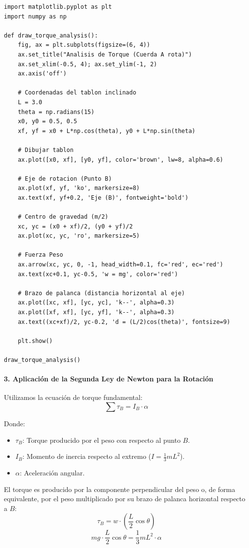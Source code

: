 \documentclass[12pt, a4paper]{article}
\begin{document}
\begin{lstlisting}
import matplotlib.pyplot as plt
import numpy as np

def draw_torque_analysis():
    fig, ax = plt.subplots(figsize=(6, 4))
    ax.set_title("Analisis de Torque (Cuerda A rota)")
    ax.set_xlim(-0.5, 4); ax.set_ylim(-1, 2)
    ax.axis('off')

    # Coordenadas del tablon inclinado
    L = 3.0
    theta = np.radians(15)
    x0, y0 = 0.5, 0.5
    xf, yf = x0 + L*np.cos(theta), y0 + L*np.sin(theta)
    
    # Dibujar tablon
    ax.plot([x0, xf], [y0, yf], color='brown', lw=8, alpha=0.6)
    
    # Eje de rotacion (Punto B)
    ax.plot(xf, yf, 'ko', markersize=8)
    ax.text(xf, yf+0.2, 'Eje (B)', fontweight='bold')

    # Centro de gravedad (m/2)
    xc, yc = (x0 + xf)/2, (y0 + yf)/2
    ax.plot(xc, yc, 'ro', markersize=5)
    
    # Fuerza Peso
    ax.arrow(xc, yc, 0, -1, head_width=0.1, fc='red', ec='red')
    ax.text(xc+0.1, yc-0.5, 'w = mg', color='red')
    
    # Brazo de palanca (distancia horizontal al eje)
    ax.plot([xc, xf], [yc, yc], 'k--', alpha=0.3)
    ax.plot([xf, xf], [yc, yf], 'k--', alpha=0.3)
    ax.text((xc+xf)/2, yc-0.2, 'd = (L/2)cos(theta)', fontsize=9)

    plt.show()

draw_torque_analysis()
\end{lstlisting}

\paragraph{3. Aplicación de la Segunda Ley de Newton para la Rotación}
Utilizamos la ecuación de torque fundamental:
$$ \sum \tau_B = I_B \cdot \alpha $$

Donde:
\begin{itemize}
    \item $\tau_B$: Torque producido por el peso con respecto al punto $B$.
    \item $I_B$: Momento de inercia respecto al extremo ($I = \frac{1}{3} m L^2$).
    \item $\alpha$: Aceleración angular.
\end{itemize}

El torque es producido por la componente perpendicular del peso o, de forma equivalente, por el peso multiplicado por su brazo de palanca horizontal respecto a $B$:
$$ \tau_B = w \cdot \left( \frac{L}{2} \cos \theta \right) $$
$$ m g \cdot \frac{L}{2} \cos \theta = \frac{1}{3} m L^2 \cdot \alpha $$
\end{document}
